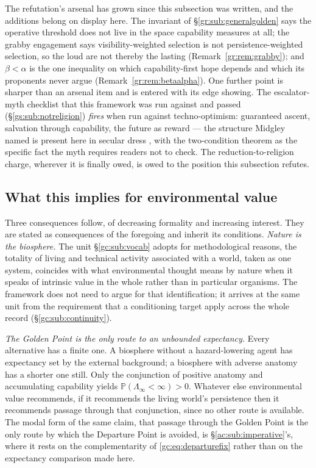 \documentclass[11pt]{article}
\numberwithin{equation}{section}
\theoremstyle{plain}
\theoremstyle{definition}
\theoremstyle{remark}
\newcommand{\PP}{\mathbb{P}}
\begin{document}
The refutation's arsenal has grown since this subsection was written,
and the additions belong on display here. The invariant of
\S\ref{gr:sub:generalgolden} says the operative threshold does not
live in the space capability measures at all; the grabby engagement
says visibility-weighted selection is not persistence-weighted
selection, so the loud are not thereby the lasting
(Remark~\ref{gr:rem:grabby}); and $\beta<\alpha$ is the one
inequality on which capability-first hope depends and which its
proponents never argue (Remark~\ref{gr:rem:betaalpha}). One further
point is sharper than an arsenal item and is entered with its edge
showing. The escalator-myth checklist that this framework was run
against and passed (\S\ref{gs:sub:notreligion}) \emph{fires} when
run against techno-optimism: guaranteed ascent, salvation through
capability, the future as reward --- the structure Midgley named is
present here in secular dress \cite{Midgley85}, with the two-condition
theorem as the specific fact the myth requires readers not to check.
The reduction-to-religion charge, wherever it is finally owed,
is owed to the position this subsection refutes.

\subsection{What this implies for environmental value}
\label{hr:sub:environment}

Three consequences follow, of decreasing formality and increasing
interest. They are stated as consequences of the foregoing and inherit
its conditions. \emph{Nature is the biosphere.} The unit \S\ref{gc:sub:vocab} adopts for
methodological reasons, the totality of living and technical activity
associated with a world, taken as one system, coincides with what
environmental thought means by nature when it speaks of intrinsic value
in the whole rather than in particular organisms. The framework does not
need to argue for that identification; it arrives at the same unit from
the requirement that a conditioning target apply across the whole record
(\S\ref{gc:sub:continuity}).

\emph{The Golden Point is the only route to an unbounded expectancy.}
Every alternative has a finite one. A biosphere without a
hazard-lowering agent has expectancy set by the external background; a
biosphere with adverse anatomy has a shorter one still. Only the
conjunction of positive anatomy and accumulating capability yields
$\PP(\Lambda_\infty<\infty)>0$. Whatever else environmental value
recommends, if it recommends the living world's persistence then it
recommends passage through that conjunction, since no other route is
available. The modal form of the same claim, that passage through the
Golden Point is the only route by which the Departure Point is avoided, is \S\ref{ac:sub:imperative}'s, where it rests on the complementarity of
\eqref{gc:eq:departurefix} rather than on the expectancy comparison made
here.
\end{document}
